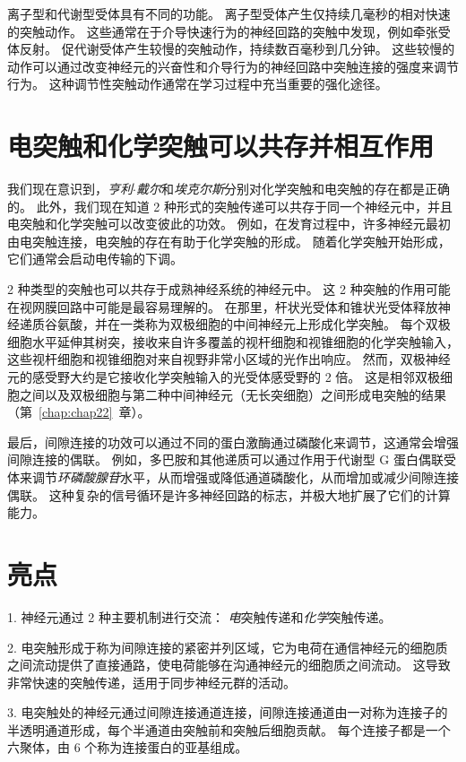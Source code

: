 离子型和代谢型受体具有不同的功能。
离子型受体产生仅持续几毫秒的相对快速的突触动作。
这些通常在于介导快速行为的神经回路的突触中发现，例如牵张受体反射。
促代谢受体产生较慢的突触动作，持续数百毫秒到几分钟。
这些较慢的动作可以通过改变神经元的兴奋性和介导行为的神经回路中突触连接的强度来调节行为。
这种调节性突触动作通常在学习过程中充当重要的强化途径。




\section{电突触和化学突触可以共存并相互作用}

我们现在意识到，\textit{亨利$\cdot$戴尔}和\textit{埃克尔斯}分别对化学突触和电突触的存在都是正确的。
此外，我们现在知道 2 种形式的突触传递可以共存于同一个神经元中，并且电突触和化学突触可以改变彼此的功效。
例如，在发育过程中，许多神经元最初由电突触连接，电突触的存在有助于化学突触的形成。
随着化学突触开始形成，它们通常会启动电传输的下调。


2 种类型的突触也可以共存于成熟神经系统的神经元中。
这 2 种突触的作用可能在视网膜回路中可能是最容易理解的。
在那里，杆状光受体和锥状光受体释放神经递质谷氨酸，并在一类称为双极细胞的中间神经元上形成化学突触。
每个双极细胞水平延伸其树突，接收来自许多覆盖的视杆细胞和视锥细胞的化学突触输入，这些视杆细胞和视锥细胞对来自视野非常小区域的光作出响应。
然而，双极神经元的感受野大约是它接收化学突触输入的光受体感受野的 2 倍。
这是相邻双极细胞之间以及双极细胞与第二种中间神经元（无长突细胞）之间形成电突触的结果（第~\ref{chap:chap22}~章）。


最后，间隙连接的功效可以通过不同的蛋白激酶通过磷酸化来调节，这通常会增强间隙连接的偶联。
例如，多巴胺和其他递质可以通过作用于代谢型 G 蛋白偶联受体来调节\textit{环磷酸腺苷}水平，从而增强或降低通道磷酸化，从而增加或减少间隙连接偶联。
这种复杂的信号循环是许多神经回路的标志，并极大地扩展了它们的计算能力。



\section{亮点}

1. 神经元通过 2 种主要机制进行交流：
\textit{电}突触传递和\textit{化学}突触传递。


2. 电突触形成于称为间隙连接的紧密并列区域，它为电荷在通信神经元的细胞质之间流动提供了直接通路，使电荷能够在沟通神经元的细胞质之间流动。
这导致非常快速的突触传递，适用于同步神经元群的活动。 


3. 电突触处的神经元通过间隙连接通道连接，间隙连接通道由一对称为连接子的半透明通道形成，每个半通道由突触前和突触后细胞贡献。
每个连接子都是一个六聚体，由 6 个称为连接蛋白的亚基组成。


